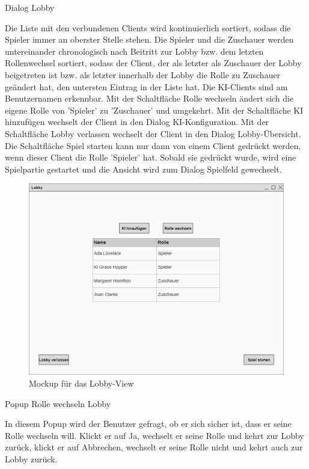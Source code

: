 Dialog \glqq{}Lobby\grqq{}

Die Liste mit den verbundenen Clients wird kontinuierlich sortiert, sodass die Spieler immer an oberster Stelle stehen. Die Spieler und die Zuschauer werden untereinander chronologisch nach Beitritt zur Lobby bzw. dem letzten Rollenwechsel sortiert, sodass der Client, der als letzter als Zuschauer der Lobby beigetreten ist bzw. als letzter innerhalb der Lobby die Rolle zu Zuschauer geändert hat, den untersten Eintrag in der Liste hat. Die KI-Clients sind am Benutzernamen erkennbar. 
Mit der Schaltfläche \glqq{}Rolle wechseln\grqq{} ändert sich die eigene Rolle von 'Spieler' zu 'Zuschauer' und umgekehrt. 
Mit der Schaltfläche \glqq{}KI hinzufügen\grqq{} wechselt der Client in den Dialog \glqq{}KI-Konfiguration\grqq{}.
Mit der Schaltfläche \glqq{}Lobby verlassen\grqq{} wechselt der Client in den Dialog \glqq{}Lobby-Übersicht\grqq{}.
Die Schaltfläche \glqq{}Spiel starten\grqq{} kann nur dann von einem Client gedrückt werden, wenn dieser Client die Rolle 'Spieler' hat. Sobald sie gedrückt wurde, wird eine Spielpartie gestartet und die Ansicht wird zum Dialog \glqq{}Spielfeld\grqq{} gewechselt.

\begin{figure}[H]
  \centering
  \includegraphics[width=\textwidth]{Meilenstein03/Lobby_Mockup.png}
  \caption{Mockup für das Lobby-View}
\end{figure}

Popup \glqq{}Rolle wechseln Lobby\grqq{}

In diesem Popup wird der Benutzer gefragt, ob er sich sicher ist, dass er seine Rolle wechseln will. Klickt er auf Ja, wechselt er seine Rolle und kehrt zur Lobby zurück, klickt er auf Abbrechen, wechselt er seine Rolle nicht und kehrt auch zur Lobby zurück.

